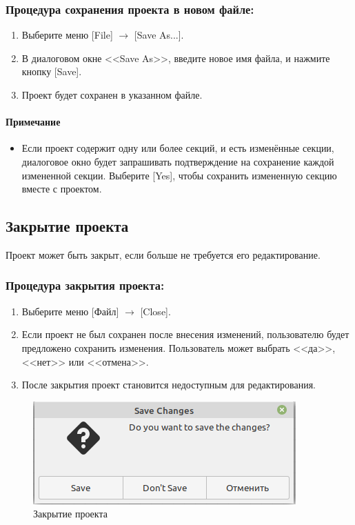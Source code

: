 \documentclass[a4paper,12pt]{extreport}
\begin{document}
\subsubsection*{Процедура сохранения проекта в новом файле:}
\begin{enumerate}
	\item Выберите меню [File] $\to$ [Save As...].
	\item В диалоговом окне <<Save As>>, введите новое имя файла, и нажмите кнопку [Save].
	\item Проект будет сохранен в указанном файле.
\end{enumerate}

\paragraph{Примечание}
\begin{itemize}
	\item Если проект содержит одну или более секций, и есть изменённые секции, диалоговое окно
	будет запрашивать подтверждение на сохранение каждой измененной секции. Выберите
	[Yes], чтобы сохранить измененную секцию вместе с проектом.
\end{itemize}

\subsection*{Закрытие проекта}
Проект может быть закрыт, если больше не требуется его редактирование.
\subsubsection*{Процедура закрытия проекта:}
\begin{enumerate}
	\item Выберите меню [Файл] $\to$ [Close].
	\item Если проект не был сохранен после внесения изменений, пользователю будет предложено
	сохранить изменения. Пользователь может выбрать <<да>>, <<нет>> или <<отмена>>.
	\item После закрытия проект становится недоступным для редактирования.
\end{enumerate}

\begin{figure}[h!]
	\centering
	\includegraphics[width=0.4\linewidth]{images/closeproject1}
	\caption{Закрытие проекта}
	\label{fig:closeproject1}
\end{figure}
\end{document}
